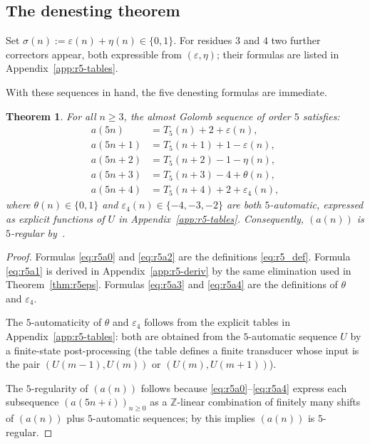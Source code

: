 \documentclass[12pt]{article}
\newtheorem{theorem}{Theorem}[section]
\theoremstyle{definition}
\theoremstyle{remark}
\newcommand{\Z}{\mathbb{Z}}
\begin{document}
\subsection{The denesting theorem}

Set $\sigma(n):=\varepsilon(n)+\eta(n)\in\{0,1\}$.
For residues $3$ and $4$ two further correctors appear, both expressible from
$(\varepsilon,\eta)$; their formulas are listed in Appendix~\ref{app:r5-tables}.

With these sequences in hand, the five denesting formulas are immediate.

\begin{theorem}\label{thm:r5}
For all $n\ge 3$, the almost Golomb sequence of order $5$ satisfies:
\begin{align}
  a(5n)   &= T_5(n)   + 2 + \varepsilon(n),   \label{eq:r5a0}\\
  a(5n+1) &= T_5(n+1) + 1 - \varepsilon(n),   \label{eq:r5a1}\\
  a(5n+2) &= T_5(n+2) - 1 - \eta(n),          \label{eq:r5a2}\\
  a(5n+3) &= T_5(n+3) - 4 + \theta(n),        \label{eq:r5a3}\\
  a(5n+4) &= T_5(n+4) + 2 + \varepsilon_4(n), \label{eq:r5a4}
\end{align}
where $\theta(n)\in\{0,1\}$ and $\varepsilon_4(n)\in\{-4,-3,-2\}$ are both
$5$-automatic, expressed as explicit functions of $U$ in
Appendix~\ref{app:r5-tables}. Consequently, $(a(n))$ is $5$-regular
by~\cite[Theorem~2.5]{AS92}.
\end{theorem}

\begin{proof}
Formulas \eqref{eq:r5a0} and \eqref{eq:r5a2} are the definitions
\eqref{eq:r5_def}. Formula \eqref{eq:r5a1} is derived in
Appendix~\ref{app:r5-deriv} by the same elimination used in Theorem~\ref{thm:r5eps}.
Formulas \eqref{eq:r5a3} and \eqref{eq:r5a4} are the definitions of $\theta$ and
$\varepsilon_4$.

The $5$-automaticity of $\theta$ and $\varepsilon_4$ follows from the explicit
tables in Appendix~\ref{app:r5-tables}: both are obtained from the $5$-automatic
sequence $U$ by a finite-state post-processing (the table defines a finite
transducer whose input is the pair $(U(m-1),U(m))$ or $(U(m),U(m+1))$).

The $5$-regularity of $(a(n))$ follows because \eqref{eq:r5a0}--\eqref{eq:r5a4}
express each subsequence $(a(5n+i))_{n\ge 0}$ as a $\Z$-linear combination of
finitely many shifts of $(a(n))$ plus $5$-automatic sequences; by
\cite[Theorem~2.5]{AS92} this implies $(a(n))$ is $5$-regular.
\end{proof}
\end{document}

